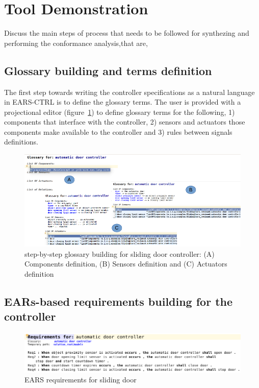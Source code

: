 \section{Tool Demonstration}
\label{sec:demo}

Discuss the main steps of process that needs to be followed for synthezing
and performing the conformance analysis,that are, 

\subsection{Glossary building and terms definition}
The first step towards writing the controller specifications as a natural
language in EARS-CTRL is to define the glossary terms. 
The user is provided with a projectional editor
(figure~\ref{fig:glossary_def}) to define glossary terms for the following,
1) components that interface with the controller, 2) sensors and actuators those components make available to the controller and 3) rules between
signals definitions.
\begin{figure}[!h]
\centering
\includegraphics[width=1\textwidth]{./images/glossary_def1.png}
\caption{step-by-step glossary building for sliding door controller: (A)
Components definition, (B) Sensors definition and (C) Actuators definition}
\label{fig:glossary_def}
\end{figure}

\subsection{EARs-based requirements building for the controller}

\begin{figure}[!h]
\centering
\includegraphics[width=1\textwidth]{./images/EARS-Reqs.png}
\caption{EARS requirements for sliding door}
\label{fig:EARS_req}
\end{figure}

